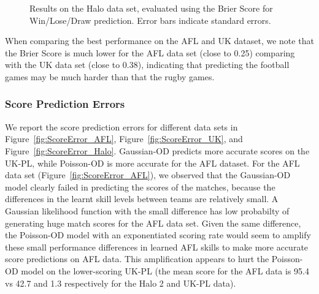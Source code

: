\begin{center}
\begin{figure*}[t!]
 \centering
\caption{\small Results on the Halo data set, evaluated using the Brier Score for Win/Lose/Draw prediction. Error bars indicate
standard errors.}
\label{fig:WLAccuracy_Halo_BrierScore}
\end{figure*}
\end{center}

When comparing the best performance on the AFL and UK dataset, we note that the Brier Score is much lower for the AFL data set (close to 0.25) comparing with the UK data set (close to 0.38), indicating that predicting the football games may be much harder than that the rugby games. 


\subsubsection{Score Prediction Errors}


We report the score prediction errors for different data sets in Figure~\ref{fig:ScoreError_AFL}, Figure~\ref{fig:ScoreError_UK}, and Figure~\ref{fig:ScoreError_Halo}. Gaussian-OD predicts more accurate scores on the UK-PL, while Poisson-OD is more accurate for the AFL dataset. For the AFL data set (Figure~\ref{fig:ScoreError_AFL}), we observed that the Gaussian-OD model clearly failed in predicting the scores of the matches, because the differences in the learnt skill levels between teams are relatively small. A Gaussian likelihood function with the small difference has low probabilty of generating huge match scores for the AFL data set. Given the same difference, the Poisson-OD model with an exponentiated scoring rate would seem to amplify these small performance differences in learned AFL skills to make more accurate score predictions on AFL data.  This amplification appears to hurt the Poisson-OD model on the lower-scoring UK-PL (the mean score for the AFL data is 95.4 vs 42.7 and 1.3 respectively for the Halo 2 and UK-PL data).

